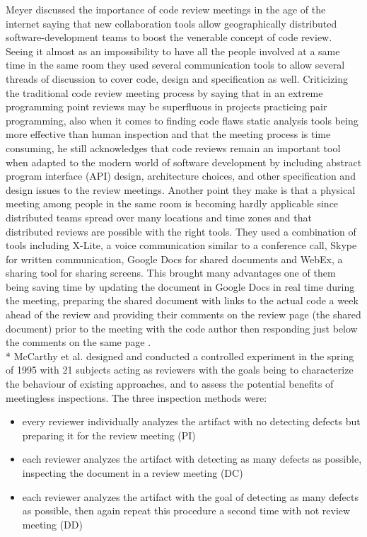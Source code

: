 Meyer discussed the importance of code review meetings in the age of the internet saying that new collaboration tools allow geographically distributed software-development teams to boost the venerable concept of code review. Seeing it almost as an impossibility to have all the people involved at a same time in the same room they used several communication tools to allow several threads of discussion to cover code, design and specification as well. Criticizing the traditional code review meeting process by saying that in an extreme programming point reviews may be superfluous in projects practicing pair programming, also when it comes to finding code flaws static analysis tools being more effective than human inspection and that the meeting process is time consuming, he still acknowledges that code reviews remain an important tool when adapted to the modern world of software development by including abstract program interface (API) design, architecture choices, and other specification and design issues to the review meetings. Another point they make is that a physical meeting among people in the same room is becoming hardly applicable since distributed teams spread over many locations and time zones and that distributed reviews are possible with the right tools. They used a combination of tools including X-Lite, a voice communication similar to a conference call, Skype for written communication, Google Docs for shared documents and WebEx, a sharing tool for sharing screens. This brought many advantages one of them being saving time by updating the document in Google Docs in real time during the meeting, preparing the shared document with links to the actual code a week ahead of the review and providing their comments on the review page (the shared document) prior to the meeting with the code author then responding just below the comments on the same page \cite{Meyer_2008}. \\*
McCarthy et al. designed and conducted a controlled experiment in the spring of 1995 with 21 subjects acting as reviewers with the goals being to characterize the behaviour of existing approaches, and to assess the potential benefits of meetingless inspections. The three inspection methods were:
\begin{itemize}
	\item every reviewer individually analyzes the artifact with no detecting defects but preparing it for the review meeting (PI)
	\item each reviewer analyzes the artifact with detecting as many defects as possible, inspecting the document in a review meeting (DC)
	\item each reviewer analyzes the artifact with the goal of detecting as many defects as possible, then again repeat this procedure a second time with not review meeting (DD)
\end{itemize}
